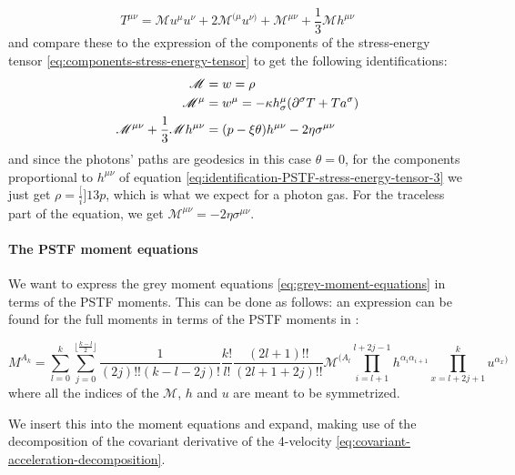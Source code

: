 \documentclass[main.tex]{subfiles}
\begin{document}
\begin{equation} \label{eq:PSTF-stress-energy-tensor-decomposition}
    T^{\mu\nu} = \mathscr M u^\mu u^\nu + 2 \mathscr M ^{(\mu} u^{\nu)}
    + \mathscr M ^{\mu\nu} + \frac{1}{3} \mathscr M h^{\mu\nu}
\end{equation}
and compare these to the expression of the components of the stress-energy tensor \eqref{eq:components-stress-energy-tensor} to get the following identifications:
%
\begin{subequations}
\begin{align}
  \mathscr M &= w = \rho  \label{eq:identification-PSTF-stress-energy-tensor-1}\\
  \mathscr M ^\mu &= w^\mu = -\kappa h^\mu _\sigma  \qty(\partial^\sigma T + T a^\sigma) \label{eq:identification-PSTF-stress-energy-tensor-2}\\
  \mathscr M^{\mu\nu} + \frac{1}{3} \mathscr M h^{\mu\nu}
  &= (p - \xi \theta)h^{\mu\nu} - 2 \eta \sigma^{\mu\nu} \label{eq:identification-PSTF-stress-energy-tensor-3}
\end{align}
\end{subequations}
and since the photons' paths are geodesics in this case \(\theta = 0\), for the components proportional to \(h^{\mu\nu}\) of equation \eqref{eq:identification-PSTF-stress-energy-tensor-3} we just get \(\rho = \frac[i]{1}{3} p\), which is what we expect for a photon gas.
For the traceless part of the equation, we get \(\mathscr M ^{\mu\nu} = -2 \eta \sigma^{\mu\nu}\).

\paragraph{The PSTF moment equations}

We want to express the grey moment equations \eqref{eq:grey-moment-equations} in terms of the PSTF moments. This can be done as follows: an expression can be found for the full moments in terms of the PSTF moments in \cite[eq. 4.10c]{Thorne:1981feb}:

\begin{equation}
  M^{A_k} = \sum_{l=0}^k \sum_{j=0}^{\lfloor \frac{k-l}{2} \rfloor}
  \frac{1}{(2j)!! (k-l-2j)!}  \frac{k!}{l!} \frac{(2l+1)!!}{(2l+1+2j)!!}
  \mathscr M^{(A_l} \prod_{i=l+1}^{l+2j-1} h^{\alpha_i \alpha_{i+1}}
  \prod_{x=l+2j+1}^k u^{\alpha_x)}
\end{equation}
where all the indices of the \(\mathscr M\), \(h\) and \(u\) are meant to be symmetrized.

We insert this into the moment equations and expand, making use of the decomposition of the covariant derivative of the 4-velocity \eqref{eq:covariant-acceleration-decomposition}.
\end{document}
